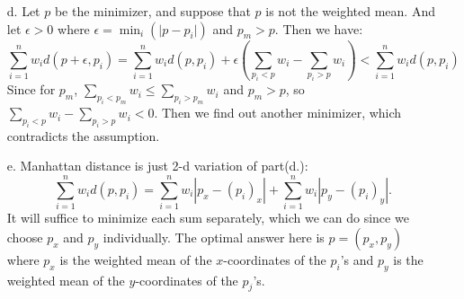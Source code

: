 \documentclass{article}
\begin{document}
\begin{enumerate}
    \pagebreak
    \item[d.] Let $p$ be the minimizer, and suppose that $p$ is not the weighted mean. And let $\epsilon>0$ where $\epsilon=\min_i(\lvert p-p_i \rvert)$ and $p_m>p$.
    Then we have:
    \[
    \sum_{i=1}^{n} w_i d(p + \epsilon, p_i) = \sum_{i=1}^{n} w_i d(p, p_i) + \epsilon \left( \sum_{p_i < p} w_i - \sum_{p_i > p} w_i \right) < \sum_{i=1}^{n} w_i d(p, p_i)
    \]
    Since for $p_m$, $\sum_{p_i < p_m} w_i \leq \sum_{p_i > p_m} w_i$ and $p_m>p$, so $\sum_{p_i < p} w_i - \sum_{p_i > p} w_i < 0$. Then we find out another minimizer, which contradicts the assumption.
    \item[e.] Manhattan distance is just 2-d variation of part(d.):
    \[
    \sum_{i=1}^{n} w_i d(p, p_i) = \sum_{i=1}^{n} w_i |p_x - (p_i)_x| + \sum_{i=1}^{n} w_i |p_y - (p_i)_y|.
    \]
    It will suffice to minimize each sum separately, which we can do since we choose $p_x$ and $p_y$ individually. The optimal answer here is $p=(p_x,p_y)$ where $p_x$ is the weighted mean of the $x$-coordinates of the $p_i$'s and $p_y$ is the weighted mean of the $y$-coordinates of the $p_j$'s.
\end{enumerate}
\end{document}
